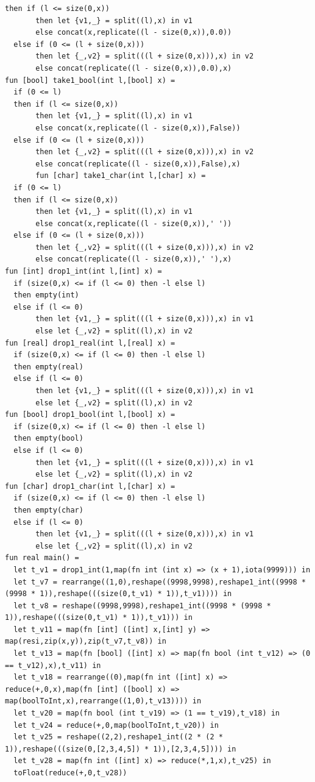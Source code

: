\documentclass[11pt]{article}
\begin{document}
\begin{lstlisting}[language=Futhark,breaklines=true]
  then if (l <= size(0,x))
       then let {v1,_} = split((l),x) in v1
       else concat(x,replicate((l - size(0,x)),0.0))
  else if (0 <= (l + size(0,x)))
       then let {_,v2} = split(((l + size(0,x))),x) in v2
       else concat(replicate((l - size(0,x)),0.0),x)
fun [bool] take1_bool(int l,[bool] x) =
  if (0 <= l)
  then if (l <= size(0,x))
       then let {v1,_} = split((l),x) in v1
       else concat(x,replicate((l - size(0,x)),False))
  else if (0 <= (l + size(0,x)))
       then let {_,v2} = split(((l + size(0,x))),x) in v2
       else concat(replicate((l - size(0,x)),False),x)
       fun [char] take1_char(int l,[char] x) =
  if (0 <= l)
  then if (l <= size(0,x))
       then let {v1,_} = split((l),x) in v1
       else concat(x,replicate((l - size(0,x)),' '))
  else if (0 <= (l + size(0,x)))
       then let {_,v2} = split(((l + size(0,x))),x) in v2
       else concat(replicate((l - size(0,x)),' '),x)
fun [int] drop1_int(int l,[int] x) =
  if (size(0,x) <= if (l <= 0) then -l else l)
  then empty(int)
  else if (l <= 0)
       then let {v1,_} = split(((l + size(0,x))),x) in v1
       else let {_,v2} = split((l),x) in v2
fun [real] drop1_real(int l,[real] x) =
  if (size(0,x) <= if (l <= 0) then -l else l)
  then empty(real)
  else if (l <= 0)
       then let {v1,_} = split(((l + size(0,x))),x) in v1
       else let {_,v2} = split((l),x) in v2
fun [bool] drop1_bool(int l,[bool] x) =
  if (size(0,x) <= if (l <= 0) then -l else l)
  then empty(bool)
  else if (l <= 0)
       then let {v1,_} = split(((l + size(0,x))),x) in v1
       else let {_,v2} = split((l),x) in v2
fun [char] drop1_char(int l,[char] x) =
  if (size(0,x) <= if (l <= 0) then -l else l)
  then empty(char)
  else if (l <= 0)
       then let {v1,_} = split(((l + size(0,x))),x) in v1
       else let {_,v2} = split((l),x) in v2
fun real main() =
  let t_v1 = drop1_int(1,map(fn int (int x) => (x + 1),iota(9999))) in
  let t_v7 = rearrange((1,0),reshape((9998,9998),reshape1_int((9998 * (9998 * 1)),reshape(((size(0,t_v1) * 1)),t_v1)))) in
  let t_v8 = reshape((9998,9998),reshape1_int((9998 * (9998 * 1)),reshape(((size(0,t_v1) * 1)),t_v1))) in
  let t_v11 = map(fn [int] ([int] x,[int] y) => map(resi,zip(x,y)),zip(t_v7,t_v8)) in
  let t_v13 = map(fn [bool] ([int] x) => map(fn bool (int t_v12) => (0 == t_v12),x),t_v11) in
  let t_v18 = rearrange((0),map(fn int ([int] x) => reduce(+,0,x),map(fn [int] ([bool] x) => map(boolToInt,x),rearrange((1,0),t_v13)))) in
  let t_v20 = map(fn bool (int t_v19) => (1 == t_v19),t_v18) in
  let t_v24 = reduce(+,0,map(boolToInt,t_v20)) in
  let t_v25 = reshape((2,2),reshape1_int((2 * (2 * 1)),reshape(((size(0,[2,3,4,5]) * 1)),[2,3,4,5]))) in
  let t_v28 = map(fn int ([int] x) => reduce(*,1,x),t_v25) in
  toFloat(reduce(+,0,t_v28))
\end{lstlisting}
\end{document}
